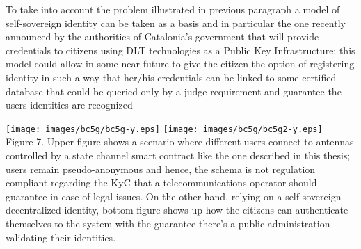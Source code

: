 \documentclass[12pt]{amsart}
\begin{document}
\begin{multicols}{2}
\vspace{0.35cm}

To take into account the problem illustrated in previous paragraph
a model of self-sovereign identity\cite{allen} can be taken as a basis
and in particular the one recently announced by the authorities
of Catalonia's government\cite{identicat} that will provide credentials
to citizens using DLT technologies as a Public Key Infrastructure; this
model could allow in some near future to give the citizen the option
of registering identity in such a way that her/his credentials can be linked
to some certified database that could be queried only by a judge
requirement and guarantee the users identities are recognized

\end{multicols}

\begin{center}
  \texttt{[image: images/bc5g/bc5g-y.eps]}
  \texttt{[image: images/bc5g/bc5g2-y.eps]}
\\
Figure 7. Upper figure shows a scenario where different users connect
to antennas controlled by a state channel smart contract like the one
described in this thesis; users remain pseudo-anonymous and hence, the
schema is not regulation compliant regarding the KyC that a
telecommunications
operator should guarantee in case of legal issues. On the other hand,
relying on a self-sovereign decentralized identity, bottom figure shows
up how the citizens can authenticate themselves to the system with the
guarantee there's a public administration validating their identities.
\\
\end{center}
\end{document}

